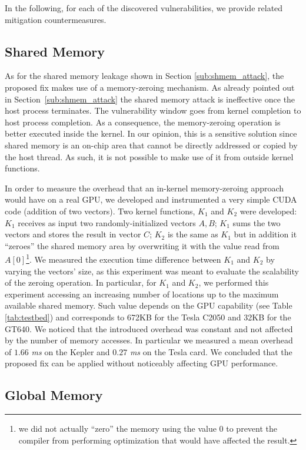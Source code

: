\documentclass[11pt,onecolumn,letterpaper]{IEEEtran}
\begin{document}
In the following, for each of the discovered vulnerabilities, we provide related mitigation countermeasures.
\subsection{Shared Memory}
As for  the shared memory leakage shown in Section \ref{sub:shmem_attack}, the proposed fix makes use of a memory-zeroing mechanism.
As already pointed out in Section~\ref{sub:shmem_attack} the shared memory attack is ineffective once the host process terminates.
The vulnerability window goes from kernel completion to host process completion.
As a consequence, the memory-zeroing operation is better executed inside the kernel.
In our opinion, this is a sensitive solution since shared memory is an on-chip area that cannot be directly addressed or copied by the host thread.
As such, it is not possible to make use of it from outside kernel functions.

\label{zeroingvector} 
In order to measure the overhead that an in-kernel memory-zeroing approach would have on a real GPU,
we developed and instrumented a very simple CUDA code (addition of two vectors).
Two kernel functions, $K_1$ and $K_2$ were developed:
$K_1$ receives as input two randomly-initialized vectors $A,B$;
$K_1$ sums the two vectors and stores the result in vector $C$;
$K_2$ is the same as $K_1$ but in addition it ``zeroes'' the shared memory area by overwriting it
with the value read from $A[0]$\footnote{we did not actually ``zero'' the memory using the value $0$
to prevent the compiler from performing optimization that would have affected the result.}. 
We measured the execution time difference between $K_1$ and $K_2$ by varying the vectors' size,
as this experiment was meant to evaluate the scalability of the zeroing operation. 
In particular, for $K_1$ and $K_2$, we performed this experiment accessing an increasing number of locations up to the maximum available shared memory.
Such value depends on the GPU capability (see Table \ref{tab:testbed}) and corresponds to 672KB for the Tesla C2050 and 32KB for the GT640.
We noticed that the introduced overhead was constant and not affected by the number of memory accesses.
In particular we 
measured a mean overhead of $1.66$ \emph{ms} on the Kepler
and $0.27$ \emph{ms} on the Tesla card.
We concluded that the proposed fix can be applied without noticeably affecting GPU performance.



\subsection{Global Memory}
\end{document}
